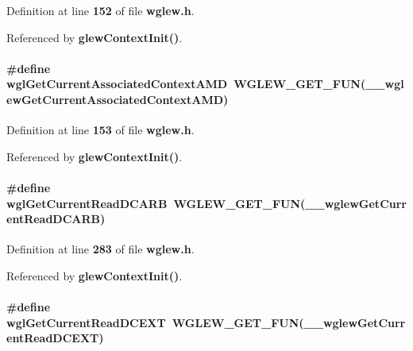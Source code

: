 Definition at line {\bf 152} of file {\bf wglew.\+h}.



Referenced by {\bf glew\+Context\+Init()}.

\paragraph[{wgl\+Get\+Current\+Associated\+Context\+A\+MD}]{\setlength{\rightskip}{0pt plus 5cm}\#define wgl\+Get\+Current\+Associated\+Context\+A\+MD~{\bf W\+G\+L\+E\+W\+\_\+\+G\+E\+T\+\_\+\+F\+UN}({\bf \+\_\+\+\_\+wglew\+Get\+Current\+Associated\+Context\+A\+MD})}\label{wglew_8h_a1210fe9a5a2a04b214b2058fbbe50d50}


Definition at line {\bf 153} of file {\bf wglew.\+h}.



Referenced by {\bf glew\+Context\+Init()}.

\paragraph[{wgl\+Get\+Current\+Read\+D\+C\+A\+RB}]{\setlength{\rightskip}{0pt plus 5cm}\#define wgl\+Get\+Current\+Read\+D\+C\+A\+RB~{\bf W\+G\+L\+E\+W\+\_\+\+G\+E\+T\+\_\+\+F\+UN}({\bf \+\_\+\+\_\+wglew\+Get\+Current\+Read\+D\+C\+A\+RB})}\label{wglew_8h_af8bdf9b4c5dd59ae10a00cae34ca02dd}


Definition at line {\bf 283} of file {\bf wglew.\+h}.



Referenced by {\bf glew\+Context\+Init()}.

\paragraph[{wgl\+Get\+Current\+Read\+D\+C\+E\+XT}]{\setlength{\rightskip}{0pt plus 5cm}\#define wgl\+Get\+Current\+Read\+D\+C\+E\+XT~{\bf W\+G\+L\+E\+W\+\_\+\+G\+E\+T\+\_\+\+F\+UN}({\bf \+\_\+\+\_\+wglew\+Get\+Current\+Read\+D\+C\+E\+XT})}\label{wglew_8h_a54b29e146020114a8585dd740842c394}



